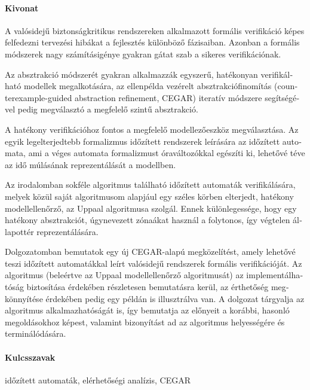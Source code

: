 \begin{otherlanguage}{magyar}

  \paragraph*{Kivonat}
  \thispagestyle{plain}
  
  A valósidejű biztonságkritikus rendszereken alkalmazott formális verifikáció képes felfedezni tervezési
  hibákat a fejlesztés különböző fázisaiban. Azonban a formális módszerek nagy számításigénye gyakran
  gátat szab a sikeres verifikációnak.
  
  Az absztrakció módszerét gyakran alkalmazzák egyszerű, hatékonyan verifikálható modellek
  megalkotására, az ellenpélda vezérelt absztrakciófinomítás (counterexample-guided abstraction
  refinement, CEGAR) iteratív módszere segítségével pedig megválasztó a megfelelő szintű absztrakció.
  
  A hatékony verifikációhoz fontos a megfelelő modellezőeszköz megválasztása. Az egyik legelterjedtebb
  formalizmus időzített rendszerek leírására az időzített automata, ami a véges automata formalizmust
  óraváltozókkal egészíti ki, lehetővé téve az idő múlásának reprezentálását a modellben.
  
  Az irodalomban sokféle algoritmus található időzített automaták verifikálására, melyek közül saját
  algoritmusom alapjául egy széles körben elterjedt, hatékony modellellenőrző, az Uppaal algoritmusa
  szolgál. Ennek különlegessége, hogy egy hatékony absztrakciót, úgynevezett zónaákat használ a
  folytonos, így végtelen állapottér reprezentálására.
  
  Dolgozatomban bemutatok egy új CEGAR-alapú megközelítést, amely lehetővé teszi időzített
  automatákkal leírt valósidejű rendszerek formális verifikációját. Az algoritmus (beleértve az Uppaal
  modellellenőrző algoritmusát) az implementálhatóság biztosítása érdekében részletesen bemutatásra
  kerül, az érthetőség megkönnyítése érdekében pedig egy példán is illusztrálva van. A dolgozat tárgyalja
  az algoritmus alkalmazhatóságát is, így bemutatja az előnyeit a korábbi, hasonló megoldásokhoz
  képest, valamint bizonyítást ad az algoritmus helyességére és terminálódására.


  \paragraph{Kulcsszavak} időzített automaták, elérhetőségi analízis, CEGAR
\end{otherlanguage}

